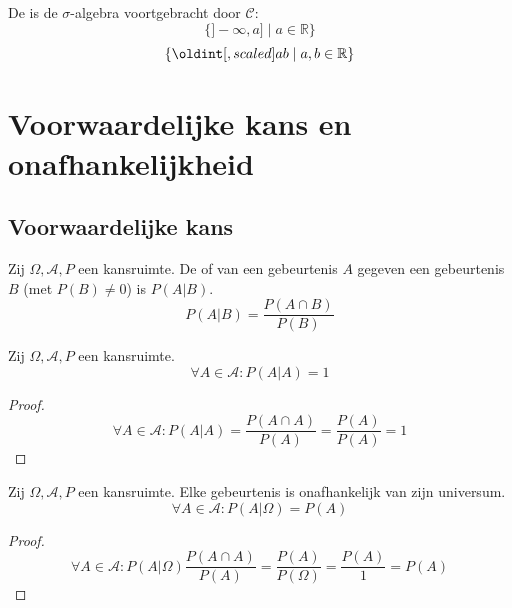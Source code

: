 \documentclass[main.tex]{subfiles}
\begin{document}
\begin{de}
  De  is de $\sigma$-algebra voortgebracht door $\mathcal{C}$:
  \[ \{ ]-\infty,a] \mid a \in \mathbb{R} \} \]  
  \[ \{ \interval{a}{b} \mid a,b\in \mathbb{R} \} \]  
\end{de}


\section{Voorwaardelijke kans en onafhankelijkheid}
\label{sec:voorwaardelijke-kans-en-onafhankelijkheid}

\subsection{Voorwaardelijke kans}
\label{sec:voorwaardelijke-kans}

\begin{de}
  \label{de:voorwaardelijke-kans} 
  Zij $\Omega,\mathcal{A},P$ een kansruimte.
  De  of  van een gebeurtenis $A$ gegeven een gebeurtenis $B$ (met $P(B) \neq 0$) is $P(A|B)$.
  \[ P(A|B) = \frac{P(A\cap B)}{P(B)} \]
\end{de}

\begin{ei}
  Zij $\Omega,\mathcal{A},P$ een kansruimte.
  \[ \forall A \in \mathcal{A}: P(A|A) = 1 \]

  \begin{proof}
    \[ \forall A \in \mathcal{A}: P(A|A) = \frac{P(A \cap A)}{P(A)} = \frac{P(A)}{P(A)} = 1 \]
  \end{proof}
\end{ei}

\begin{ei}
  \label{ei:gebeurtenis onafhankelijk van universum}
  Zij $\Omega,\mathcal{A},P$ een kansruimte.
  Elke gebeurtenis is onafhankelijk van zijn universum.
  \[ \forall A \in \mathcal{A}: P(A|\Omega) = P(A) \]

  \begin{proof}
    \[ \forall A \in \mathcal{A}: P(A|\Omega) \frac{P(A \cap A)}{P(A)} = \frac{P(A)}{P(\Omega)} = \frac{P(A)}{1} = P(A)\]
  \end{proof}
\end{ei}
\end{document}
